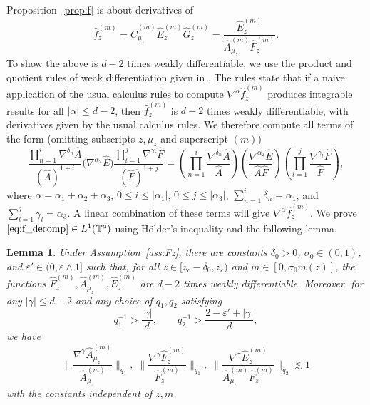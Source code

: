\documentclass[11pt,hidelinks]{article}
\theoremstyle{plain}
\newtheorem{lemma}[theorem]{Lemma}
\numberwithin{equation}{section}
\newcommand{\eps}{\varepsilon}
\newcommand{\T}{\mathbb{T}}
\newcommand{\grad}{\nabla}
\newcommand{\inv}{^{-1}}
\renewcommand{\(}{\left(}
\renewcommand{\)}{\right)}
\newcommand{\1}{\mathds{1}}
\providecommand{\abs}[1]{\lvert#1\rvert}
\providecommand{\biggnorm}[1]{\bigg\lVert#1\bigg\rVert}
\newcommand{\mz}{m(z)}
\newcommand{\muz}{{\mu_z}}
\newcommand{\supm}{^{(m)}}
\begin{document}
Proposition~\ref{prop:f} is about derivatives of 
\begin{equation}
\hat f_z \supm =  \hat C_\muz\supm \hat E_z\supm \hat G_z\supm
= \frac{ \hat E_z\supm } { \hat A_\muz \supm \hat F_z \supm }.
\end{equation}
To show the above is $d-2$ times weakly differentiable, we use the product and quotient rules of weak differentiation given in \cite[Lemmas~A.2--A.3]{LS24a}. 
The rules state that if a naive application of the usual calculus rules to compute $\grad^\alpha \hat f_z \supm$ produces integrable results for all $\abs\alpha \le d-2$, then $\hat f_z\supm$ is $d-2$ times weakly differentiable, with derivatives given by the usual calculus rules.
We therefore compute all terms of the form
(omitting subscripts $z, \muz$ and superscript $(m)$)
\begin{equation} \label{eq:f_decomp}
\frac{ \prod_{n=1}^i \grad^{\delta_n} \hat A  }{ (\hat A) ^{1+i} }
\big( \grad^{\alpha_2} \hat E \big)
\frac{ \prod_{l=1}^j \grad^{\gamma_l} \hat F  }{ ( \hat F) ^{1+j} }
=
\( \prod_{n=1}^i \frac{ \grad^{\delta_n} \hat A }{\hat A } \)
\( \frac{ \grad^{\alpha_2} \hat E }{ \hat A \hat F } \)
\( \prod_{l=1}^j \frac{ \grad^{\gamma_l} \hat F  }{ \hat F } \),
\end{equation}
where $\alpha = \alpha_1 + \alpha_2 + \alpha_3$, $ 0 \le i \le \abs {\alpha_1}$, $0 \le j \le \abs {\alpha_3 }$, $\sum_{n=1}^i \delta_n = \alpha_1$, and $\sum_{l=1}^j \gamma_l = \alpha_3$.
A linear combination of these terms will give $\grad^\alpha \hat f_z \supm$. 
We prove $\eqref{eq:f_decomp} \in L^1(\T^d)$ using H\"older's inequality and the following lemma. 

\begin{lemma} \label{lem:AFEbds}
Under Assumption~\ref{ass:Fz}, 
there are constants $\delta_0 >0$, $\sigma_0 \in (0,1)$, and $\eps' \in (0, \eps \wedge 1]$
such that, for all $z \in [ z_c - \delta_0, z_c )$ and $m \in [0, \sigma_0 \mz]$,
the functions $\hat F_z\supm, \hat A_\muz\supm, \hat E_z\supm$ are $d-2$ times weakly differentiable.
Moreover, for any $\abs \gamma \le d-2$ and
any choice of $q_1, q_2$ satisfying 
\begin{equation}
    q_1\inv > \frac{ \abs \gamma } d,
    \qquad
    q_2\inv > \frac{ 2 - \eps' + \abs \gamma } d, 
\end{equation}
we have 
\begin{equation}
\label{eq:AFE}
\biggnorm{ \frac{ \grad^\gamma \hat A\supm_\muz }{ \hat A\supm_\muz } }_{q_1}, \;
\biggnorm{ \frac{ \grad^\gamma \hat F_z\supm }{ \hat F_z\supm } }_{q_1}, \;
\biggnorm{ \frac{ \grad^\gamma \hat E_z\supm }{ \hat A_\muz\supm \hat F_z\supm }}_{q_2}
\lesssim 1
\end{equation} 
with the constants independent of $z, m$. 
\end{lemma}
\end{document}
